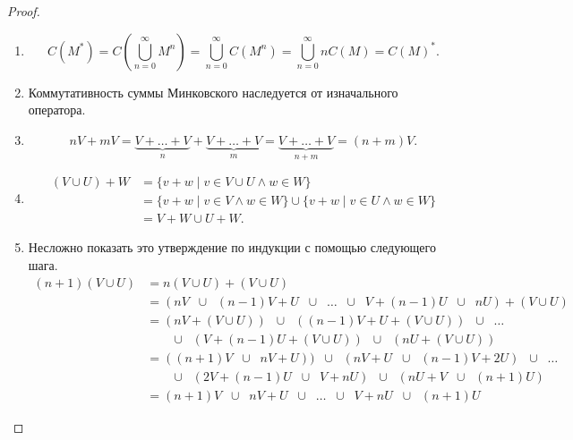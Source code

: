 \documentclass[12pt,a4paper]{article}
\begin{document}
\begin{problem}{8}
\begin{enumerate}
\begin{proof}
\begin{enumerate}
                        \item
                            \[C(M^*) = C\left(\bigcup_{n=0}^\infty M^n\right) = \bigcup_{n=0}^\infty C(M^n) = \bigcup_{n=0}^\infty nC(M) = C(M)^*.\]
                        \item Коммутативность суммы Минковского наследуется от изначального оператора.
                        \item
                            \[
                                nV + mV
                                = \underbrace{V + \dots + V}_n + \underbrace{V + \dots + V}_m
                                = \underbrace{V + \dots + V}_{n+m}
                                = (n+m)V.
                            \]
                        \item
                            \begin{align*}
                                (V \cup U) + W
                                &= \{v + w \mid v \in V \cup U \wedge w \in W\}\\
                                &= \{v + w \mid v \in V \wedge w \in W\} \cup \{v + w \mid v \in U \wedge w \in W\}\\
                                &= V + W \cup U + W.
                            \end{align*}
                        \item Несложно показать это утверждение по индукции с помощью следующего шага.
                            \begin{align*}
                                (n+1)(V \cup U)
                                &= n(V \cup U) + (V \cup U)\\
                                &= (nV \;\; \cup \;\; (n-1)V + U \;\; \cup \;\; \dots \;\; \cup \;\; V + (n-1)U \;\; \cup \;\; nU) + (V \cup U)\\
                                &= (nV + (V \cup U)) \;\; \cup \;\; ((n-1)V + U + (V \cup U)) \;\; \cup \;\; \dots\\
                                &\qquad \cup \;\; (V + (n-1)U + (V \cup U)) \;\; \cup \;\; (nU + (V \cup U))\\
                                &= ((n+1)V \;\; \cup \;\; nV + U)) \;\; \cup \;\; (nV + U \;\; \cup \;\; (n-1)V + 2U) \;\; \cup \;\; \dots\\
                                &\qquad \cup \;\; (2V + (n-1)U \;\; \cup \;\; V + nU) \;\; \cup \;\; (nU + V \;\; \cup \;\; (n+1)U)\\
                                &= (n+1)V \;\; \cup \;\; nV + U \;\; \cup \;\; \dots \;\; \cup \;\; V + nU \;\; \cup \;\; (n+1)U

\end{align*}
\end{enumerate}
\end{proof}
\end{enumerate}
\end{problem}
\end{document}
